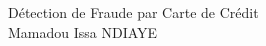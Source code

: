 \documentclass[11pt]{article}
\begin{document}
Détection de Fraude par Carte de Crédit\\
Mamadou Issa NDIAYE
\end{document}
